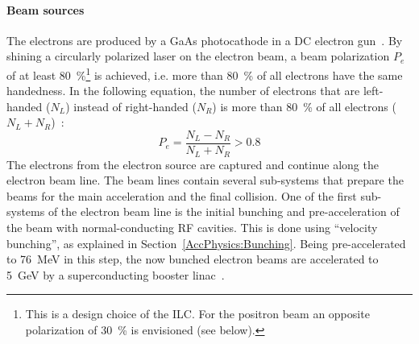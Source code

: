 \paragraph{Beam sources}
The electrons are produced by a GaAs photocathode in a DC electron gun~\cite[p. 13]{TDR32}.
By shining a circularly polarized laser on the electron beam, a beam polarization $P_e$ of at least \SI{80}{\percent}\footnote{This is a design choice of the ILC. For the positron beam an opposite polarization of \SI{30}{\percent} is envisioned (see below).} is achieved, i.e. more than \SI{80}{\percent} of all electrons have the same handedness.
In the following equation, the number of electrons that are left-handed ($N_L$) instead of right-handed ($N_R$) is more than \SI{80}{\percent} of all electrons ($N_L+N_R$)~\cite[p. 81]{TDR32}: 
\begin{equation}
 P_e = \frac{N_L-N_R}{N_L+N_R} > 0.8
\end{equation}
The electrons from the electron source are captured and continue along the electron beam line.
The beam lines contain several sub-systems that prepare the beams for the main acceleration and the final collision.
One of the first sub-systems of the electron beam line is the initial bunching and pre-acceleration of the beam with normal-conducting RF cavities.
This is done using ``velocity bunching'', as explained in Section~\ref{AccPhysics:Bunching}.
Being pre-accelerated to \SI{76}{\MeV} in this step, the now bunched electron beams are accelerated to \SI{5}{\GeV} by a  superconducting booster linac~\cite[p. 81f]{TDR32}.

